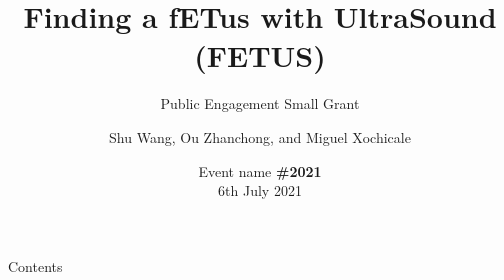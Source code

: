 \documentclass[xcolor={dvipsnames},aspectratio=169,10pt]{beamer}
\title{Finding a fETus with UltraSound (FETUS)}
\subtitle{Public Engagement Small Grant}
\author{
Shu Wang,
Ou Zhanchong, and
Miguel Xochicale
}
\date{
Event name {\bf \#2021} \\
6th July 2021
}
\institute{
	\faEnvelope e-mail@server.com \\
	\faGithubAlt @githubhandler \faTwitter @twitterhandler
		}
\begin{document}
\maketitle

\begin{frame}{Contents}
    \tableofcontents
\end{frame}








\maketitle
\end{document}
